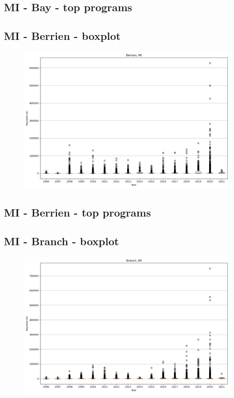 \subsection*{MI - Bay - top programs}

\newpage
\subsection*{MI - Berrien - boxplot}
\begin{figure}[h]
\centering
\includegraphics[width=7in]{../output/boxplots/counties/Berrien-MI_boxplot.png}
\end{figure}


\subsection*{MI - Berrien - top programs}

\newpage
\subsection*{MI - Branch - boxplot}
\begin{figure}[h]
\centering
\includegraphics[width=7in]{../output/boxplots/counties/Branch-MI_boxplot.png}
\end{figure}


